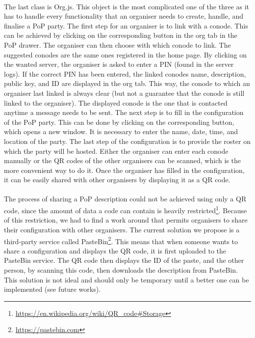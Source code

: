 \paragraph{}
The last class is Org.js. This object is the most complicated one of the three as it has to handle every functionality that an organiser needs to create, handle, and finalise a PoP party. The first step for an organiser is to link with a conode. This can be achieved by clicking on the corresponding button in the org tab in the PoP drawer. The organiser can then choose with which conode to link. The suggested conodes are the same ones registered in the home page. By clicking on the wanted server, the organiser is asked to enter a PIN (found in the server logs). If the correct PIN has been entered, the linked conodes name, description, public key, and ID are displayed in the org tab. This way, the conode to which an organiser last linked is always clear (but not a guarantee that the conode is still linked to the organiser). The displayed conode is the one that is contacted anytime a message needs to be sent. The next step is to fill in the configuration of the PoP party. This can be done by clicking on the corresponding button, which opens a new window. It is necessary to enter the name, date, time, and location of the party. The last step of the configuration is to provide the roster on which the party will be hosted. Either the organiser can enter each conode manually or the QR codes of the other organisers can be scanned, which is the more convenient way to do it. Once the organiser has filled in the configuration, it can be easily shared with other organisers by displaying it as a QR code.

\paragraph{}
The process of sharing a PoP description could not be achieved using only a QR code, since the amount of data a code can contain is heavily restricted\footnote{\url{https://en.wikipedia.org/wiki/QR_code#Storage}}. Because of this restriction, we had to find a work around that permits organisers to share their configuration with other organisers. The current solution we propose is a third-party service called PasteBin\footnote{\url{https://pastebin.com}}. This means that when someone wants to share a configuration and displays the QR code, it is first uploaded to the PasteBin service. The QR code then displays the ID of the paste, and the other person, by scanning this code, then downloads the description from PasteBin. This solution is not ideal and should only be temporary until a better one can be implemented (see future works).

